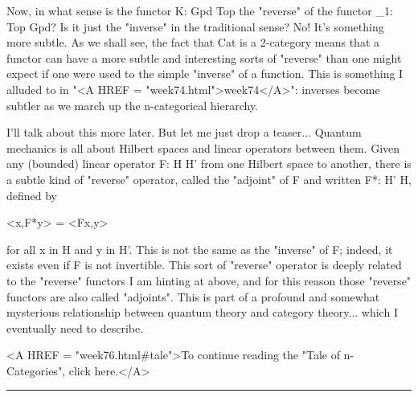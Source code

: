 Now, in what sense is the functor K: Gpd \to  Top the
"reverse" of the functor \Pi _{1}: Top \to  Gpd?  Is it
just the "inverse" in the traditional sense?  No!  It's
something more subtle.  As we shall see, the fact that Cat is a
2-category means that a functor can have a more subtle and interesting
sorts of "reverse" than one might expect if one were used to
the simple "inverse" of a function.  This is something I
alluded to in "<A HREF = "week74.html">week74</A>": inverses
become subtler as we march up the n-categorical hierarchy.

I'll talk about this more later.  But let me just drop a teaser...
Quantum mechanics is all about Hilbert spaces and linear operators
between them.  Given any (bounded) linear operator F: H \to  H' from
one Hilbert space to another, there is a subtle kind of
"reverse" operator, called the "adjoint" of F and
written F*: H' \to  H, defined by

                      <x,F*y> = <Fx,y> 

for all x in H and y in H'.  This is not the same as the
"inverse" of F; indeed, it exists even if F is not invertible.
This sort of "reverse" operator is deeply related to the
"reverse" functors I am hinting at above, and for this reason
those "reverse" functors are also called "adjoints".
This is part of a profound and somewhat mysterious relationship between
quantum theory and category theory... which I eventually need to
describe.

<A HREF = "week76.html#tale">To continue reading the "Tale of
n-Categories", click here.</A>






\par\noindent\rule{\textwidth}{0.4pt}
